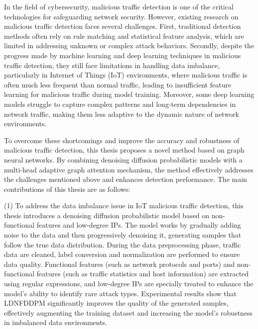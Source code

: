 \documentclass[promaster]{thesis-uestc}
\begin{document}
\begin{englishabstract}
 
In the field of cybersecurity, malicious traffic detection is one of the critical technologies for safeguarding network security. However, existing research on malicious traffic detection faces several challenges. First, traditional detection methods often rely on rule matching and statistical feature analysis, which are limited in addressing unknown or complex attack behaviors. Secondly, despite the progress made by machine learning and deep learning techniques in malicious traffic detection, they still face limitations in handling data imbalance, particularly in Internet of Things (IoT) environments, where malicious traffic is often much less frequent than normal traffic, leading to insufficient feature learning for malicious traffic during model training. Moreover, some deep learning models struggle to capture complex patterns and long-term dependencies in network traffic, making them less adaptive to the dynamic nature of network environments.

To overcome these shortcomings and improve the accuracy and robustness of malicious traffic detection, this thesis proposes a novel method based on graph neural networks. By combining denoising diffusion probabilistic models with a multi-head adaptive graph attention mechanism, the method effectively addresses the challenges mentioned above and enhances detection performance. The main contributions of this thesis are as follows:

(1) To address the data imbalance issue in IoT malicious traffic detection, this thesis introduces a denoising diffusion probabilistic model based on non-functional features and low-degree IPs. The model works by gradually adding noise to the data and then progressively denoising it, generating samples that follow the true data distribution. During the data preprocessing phase, traffic data are cleaned, label conversion and normalization are performed to ensure data quality. Functional features (such as network protocols and ports) and non-functional features (such as traffic statistics and host information) are extracted using regular expressions, and low-degree IPs are specially treated to enhance the model’s ability to identify rare attack types. Experimental results show that LDNFDDPM significantly improves the quality of the generated samples, effectively augmenting the training dataset and increasing the model’s robustness in imbalanced data environments.


\end{englishabstract}
\end{document}
